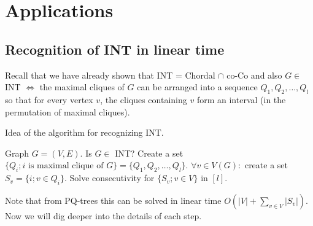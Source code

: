 \section{Applications}

\subsection{Recognition of INT in linear time}

Recall that we have already shown that INT = Chordal $\cap$ co-Co and also $G \in$ INT $\iff$ the maximal cliques of $G$ can be arranged into a sequence $Q_1, Q_2, \dots, Q_l$ so that for every vertex $v$, the cliques containing $v$ form an interval (in the permutation of maximal cliques).

\begin{algorithm}[!ht]
	\caption{Idea of the algorithm for recognizing INT.}
	\begin{algorithmic}[1]
			\Require Graph $G = (V,E)$.
			\Ensure Is $G \in$ INT?
			\State Create a set $\{Q_{i}; i \text{ is maximal clique of } G\} = \{Q_{1}, Q_{2}, \dots, Q_{l}\}$.
			\State $\forall v \in V(G):$ create a set $S_{v} = \{i; v \in Q_{i}\}$.
			\State Solve consecutivity for $\{S_{v}; v \in V\}$ in $[l]$.
	\end{algorithmic}
\end{algorithm}

Note that from PQ-trees this can be solved in linear time $O(|V| + \sum_{v \in V} |S_{v}|)$. Now we will dig deeper into the details of each step.

